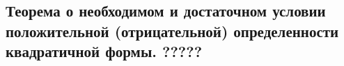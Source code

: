 {
\subsection{Теорема о необходимом и достаточном условии положительной (отрицательной) определенности квадратичной формы. ?????}
}